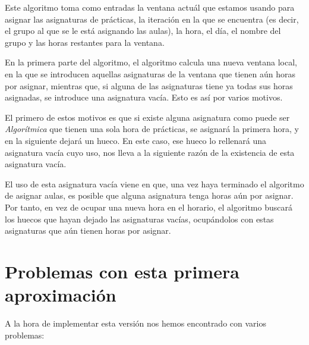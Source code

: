 Este algoritmo toma como entradas la ventana actuál que estamos usando para asignar las asignaturas de prácticas, la iteración en la que se encuentra (es decir, el grupo al que se le está asignando las aulas), la hora, el día, el nombre del grupo y las horas restantes para la ventana.

En la primera parte del algoritmo, el algoritmo calcula una nueva ventana local, en la que se introducen aquellas asignaturas de la ventana que tienen aún horas por asignar, mientras que, si alguna de las asignaturas tiene ya todas sus horas asignadas, se introduce una asignatura vacía. Esto es así por varios motivos. 

El primero de estos motivos es que si existe alguna asignatura como puede ser \textit{Algorítmica} que tienen una sola hora de prácticas, se asignará la primera hora, y en la siguiente dejará un hueco. En este caso, ese hueco lo rellenará una asignatura vacía cuyo uso, nos lleva a la siguiente razón de la existencia de esta asignatura vacía.

El uso de esta asignatura vacía viene en que, una vez haya terminado el algoritmo de asignar aulas, es posible que alguna asignatura tenga horas aún por asignar. Por tanto, en vez de ocupar una nueva hora en el horario, el algoritmo buscará los huecos que hayan dejado las asignaturas vacías, ocupándolos con estas asignaturas que aún tienen horas por asignar.

\section{Problemas con esta primera aproximación}
A la hora de implementar esta versión nos hemos encontrado con varios problemas:

